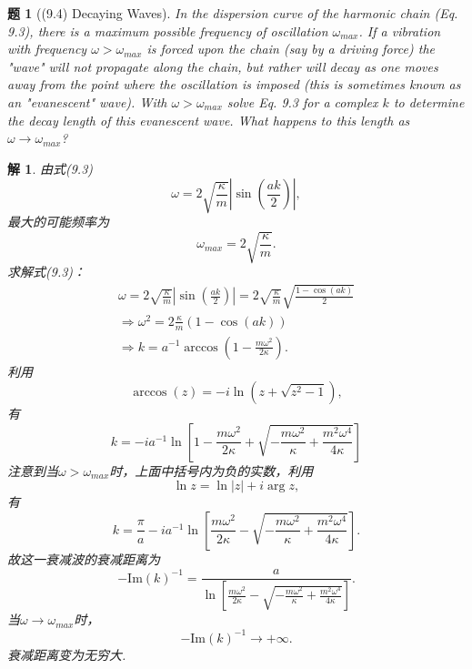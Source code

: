 \documentclass[UTF8,10pt,a4paper]{article}
\theoremstyle{Problem}
\newtheorem{prob}{题}
\theoremstyle{Solution}
\newtheorem*{sol}{解}
\providecommand{\abs}[1]{\left\lvert#1\right\rvert}
\begin{document}
\begin{prob}[(9.4) Decaying Waves]
    In the dispersion curve of the harmonic chain (Eq. 9.3), there is a maximum possible frequency of oscillation $\omega_{max}$. If a vibration with frequency $\omega>\omega_{max}$ is forced upon the chain (say by a driving force) the "wave" will not propagate along the chain, but rather will decay as one moves away from the point where the oscillation is imposed (this is sometimes known as an "evanescent" wave). With $\omega>\omega_{max}$ solve Eq. 9.3 for a complex $k$ to determine the decay length of this evanescent wave. What happens to this length as $\omega\rightarrow\omega_{max}$?
\end{prob}
\begin{sol}
    由式(9.3)
    \[
        \omega=2\sqrt{\frac{\kappa}{m}}\abs{\sin\left(\frac{ak}{2}\right)},
    \]
    最大的可能频率为
    \begin{equation}
        \omega_{max}=2\sqrt{\frac{\kappa}{m}}.
    \end{equation}
    求解式(9.3)：
    \begin{gather}
        \omega=2\sqrt{\frac{\kappa}{m}}\abs{\sin\left(\frac{ak}{2}\right)}=2\sqrt{\frac{\kappa}{m}}\sqrt{\frac{1-\cos(ak)}{2}}\\
        \Longrightarrow\omega^2=2\frac{\kappa}{m}(1-\cos(ak))\\
        \Longrightarrow k=a^{-1}\arccos\left(1-\frac{m\omega^2}{2\kappa}\right).
    \end{gather}
    利用
    \begin{equation}
        \arccos(z)=-i\ln(z+\sqrt{z^2-1}),
    \end{equation}
    有
    \begin{equation}
        k=-ia^{-1}\ln\left[1-\frac{m\omega^2}{2\kappa}+\sqrt{-\frac{m\omega^2}{\kappa}+\frac{m^2\omega^4}{4\kappa}}\right]
    \end{equation}
    注意到当$\omega>\omega_{max}$时，上面中括号内为负的实数，利用
    \begin{equation}
        \ln z=\ln\abs{z}+i\arg z,
    \end{equation}
    有
    \begin{equation}
        k=\frac{\pi}{a}-ia^{-1}\ln\left[\frac{m\omega^2}{2\kappa}-\sqrt{-\frac{m\omega^2}{\kappa}+\frac{m^2\omega^4}{4\kappa}}\right].
    \end{equation}
    故这一衰减波的衰减距离为
    \begin{equation}
        -\text{Im}(k)^{-1}=\frac{a}{\ln\left[\frac{m\omega^2}{2\kappa}-\sqrt{-\frac{m\omega^2}{\kappa}+\frac{m^2\omega^4}{4\kappa}}\right]}.
    \end{equation}
    当$\omega\rightarrow\omega_{max}$时，
    \begin{equation}
        -\text{Im}(k)^{-1}\rightarrow+\infty.
    \end{equation}
    衰减距离变为无穷大.
\end{sol}
\end{document}
